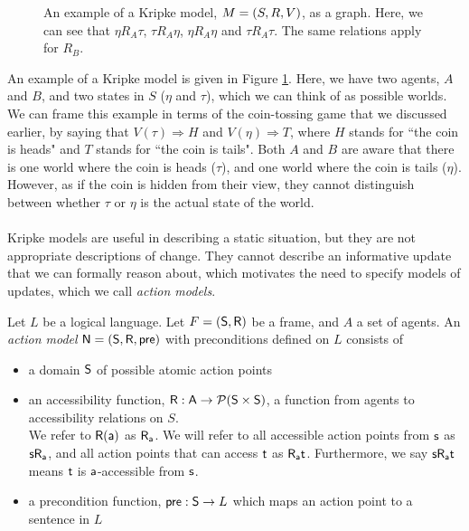 \begin{figure}
\centering
{}
\caption[Kripke model example of coin-game]{An example of a Kripke model, $M = (S,R,V)$, as a graph. Here, we can see that
$\eta R_A \tau$, $\tau R_A \eta$, $\eta R_A \eta$ and $\tau R_A \tau$. The same relations apply for
$R_B$.}
\label{figure:exampleModel}
\end{figure}

An example of a Kripke model is given in Figure \ref{figure:exampleModel}.
Here, we have two agents, $A$ and $B$, and two states in $S$ ($\eta$ and $\tau$), which we can think
of as possible worlds.
We can frame this example in terms of the coin-tossing game that we discussed earlier, by saying
that $V(\tau) \Rightarrow H$ and $V(\eta) \Rightarrow T$, where $H$ stands for ``the coin is heads"
and $T$ stands for ``the coin is tails".
Both $A$ and $B$ are aware that there is one world where the coin is heads ($\tau$), and one
world where the coin is tails ($\eta$).
However, as if the coin is hidden from their view, they cannot distinguish between whether $\tau$ or
$\eta$ is the actual state of the world.\\
\\
Kripke models are useful in describing a static situation, but they are not appropriate descriptions
of change.
They cannot describe an informative update that we can formally reason about, which motivates the
need to specify models of updates, which we call {\em action models}.

\begin{defn} \label{evModel}
	Let $L$ be a logical language.
	Let $F = (\mathrm{\mathsf{S}}, \mathrm{\mathsf{R}})$ be a frame, and $A$ a set of agents.
	An {\em action model} $\mathrm{\mathsf{\mathrm{\mathsf{N}} = (S, R, pre)}}$ with preconditions defined
  on $L$ consists of
	\begin{itemize}
		\item a domain $\mathrm{\mathsf{S}}$ of possible atomic action points
		\item an accessibility function, $\mathrm{\mathsf{R: A \to \mathcal{P}(S \times
        S)}}$, a function from agents to
		accessibility relations on $S$.\\
		We refer to $\mathrm{\mathsf{R(a)}}$ as $\mathrm{\mathsf{R_a}}$.
		We will refer to all accessible action points from $\mathrm{\mathsf{s}}$ as
    $\mathrm{\mathsf{s R_a}}$, and all action points that
		can access $\mathrm{\mathsf{t}}$ as $\mathrm{\mathsf{R_a t}}$.
		Furthermore, we say $\mathrm{\mathsf{s R_a t}}$ means $\mathrm{\mathsf{t}}$ is
    $\mathrm{\mathsf{a}}$-accessible from $\mathrm{\mathsf{s}}$.
		\item a precondition function, $\mathrm{\mathsf{pre: S}} \to L$ which maps an action point to a
		sentence in $L$
	\end{itemize}
\end{defn}

